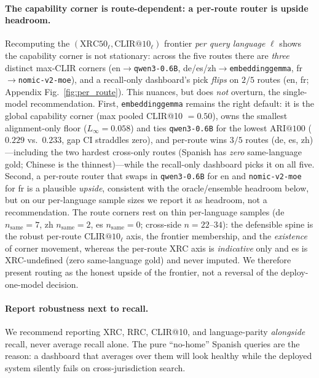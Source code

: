 \documentclass[11pt]{article}
\begin{document}
\paragraph{The capability corner is route-dependent: a per-route router is
upside headroom.}
Recomputing the $(\mathrm{XRC50}_\ell,\mathrm{CLIR@10}_\ell)$ frontier
\emph{per query language} $\ell$ shows the capability corner is not stationary:
across the five routes there are \emph{three} distinct max-CLIR corners
(en$\rightarrow$\texttt{qwen3-0.6B}, de/es/zh$\rightarrow$\texttt{embeddinggemma},
fr$\rightarrow$\texttt{nomic-v2-moe}), and a recall-only dashboard's pick
\emph{flips} on $2/5$ routes (en, fr; Appendix Fig.~\ref{fig:per_route}). This nuances,
but does \emph{not} overturn, the single-model recommendation. First,
\texttt{embeddinggemma} remains the right default: it is the global capability
corner (max pooled CLIR@10 $=0.50$), owns the smallest alignment-only floor
($L_\infty=0.058$) and ties \texttt{qwen3-0.6B} for the lowest $\mathrm{ARI@}100$
($0.229$ vs.\ $0.233$, gap CI straddles zero), and per-route wins
$3/5$ routes (de, es, zh)---including the two hardest cross-only routes (Spanish
has \emph{zero} same-language gold; Chinese is the thinnest)---while the
recall-only dashboard picks it on all five. Second, a per-route router that swaps
in \texttt{qwen3-0.6B} for en and \texttt{nomic-v2-moe} for fr is a plausible
\emph{upside}, consistent with the oracle/ensemble headroom below, but on our
per-language sample sizes we report it as headroom, not a recommendation. The
route corners rest on thin per-language samples (de $n_{\text{same}}{=}7$, zh
$n_{\text{same}}{=}2$, es $n_{\text{same}}{=}0$; cross-side $n{=}22$--$34$): the
defensible spine is the robust per-route $\mathrm{CLIR@10}_\ell$ axis, the
frontier membership, and the \emph{existence} of corner movement, whereas the
per-route XRC axis is \emph{indicative} only and es is XRC-undefined (zero
same-language gold) and never imputed. We therefore present routing as the honest
upside of the frontier, not a reversal of the deploy-one-model decision.

\paragraph{Report robustness next to recall.}
We recommend reporting XRC, RRC, CLIR@10, and language-parity \emph{alongside}
recall, never average recall alone. The pure ``no-home'' Spanish queries are the
reason: a dashboard that averages over them will look healthy while the deployed
system silently fails on cross-jurisdiction search.
\end{document}
